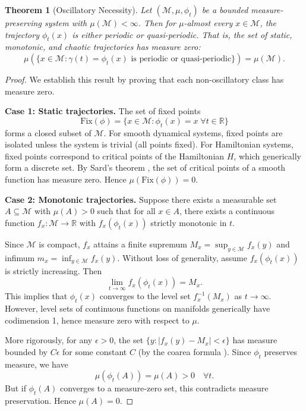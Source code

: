 \documentclass[twocolumn,10pt,a4paper]{article}
\newtheorem{theorem}{Theorem}[section]
\theoremstyle{remark}
\newcommand{\manifold}{\mathcal{M}}
\newcommand{\Reals}{\mathbb{R}}
\begin{document}
\begin{theorem}[Oscillatory Necessity]
\label{thm:oscillatory_necessity}
Let $(\manifold, \mu, \phi_t)$ be a bounded measure-preserving system with $\mu(\manifold) < \infty$. Then for $\mu$-almost every $x \in \manifold$, the trajectory $\phi_t(x)$ is either periodic or quasi-periodic. That is, the set of static, monotonic, and chaotic trajectories has measure zero:
\begin{equation}
\mu\left(\{x \in \manifold : \gamma(t) = \phi_t(x) \text{ is periodic or quasi-periodic}\}\right) = \mu(\manifold).
\end{equation}
\end{theorem}

\begin{proof}
We establish this result by proving that each non-oscillatory class has measure zero.

\textbf{Case 1: Static trajectories.} The set of fixed points
\begin{equation}
\text{Fix}(\phi) = \{x \in \manifold : \phi_t(x) = x \; \forall t \in \Reals\}
\end{equation}
forms a closed subset of $\manifold$. For smooth dynamical systems, fixed points are isolated unless the system is trivial (all points fixed). For Hamiltonian systems, fixed points correspond to critical points of the Hamiltonian $H$, which generically form a discrete set. By Sard's theorem \citep{Sard1942}, the set of critical points of a smooth function has measure zero. Hence $\mu(\text{Fix}(\phi)) = 0$.

\textbf{Case 2: Monotonic trajectories.} Suppose there exists a measurable set $A \subseteq \manifold$ with $\mu(A) > 0$ such that for all $x \in A$, there exists a continuous function $f_x: \manifold \to \Reals$ with $f_x(\phi_t(x))$ strictly monotonic in $t$.

Since $\manifold$ is compact, $f_x$ attains a finite supremum $M_x = \sup_{y \in \manifold} f_x(y)$ and infimum $m_x = \inf_{y \in \manifold} f_x(y)$. Without loss of generality, assume $f_x(\phi_t(x))$ is strictly increasing. Then
\begin{equation}
\lim_{t \to \infty} f_x(\phi_t(x)) = M_x.
\end{equation}
This implies that $\phi_t(x)$ converges to the level set $f_x^{-1}(M_x)$ as $t \to \infty$. However, level sets of continuous functions on manifolds generically have codimension 1, hence measure zero with respect to $\mu$. 

More rigorously, for any $\epsilon > 0$, the set $\{y : |f_x(y) - M_x| < \epsilon\}$ has measure bounded by $C\epsilon$ for some constant $C$ (by the coarea formula \citep{Federer1969}). Since $\phi_t$ preserves measure, we have
\begin{equation}
\mu(\phi_t(A)) = \mu(A) > 0 \quad \forall t.
\end{equation}
But if $\phi_t(A)$ converges to a measure-zero set, this contradicts measure preservation. Hence $\mu(A) = 0$.


\end{proof}
\end{document}
